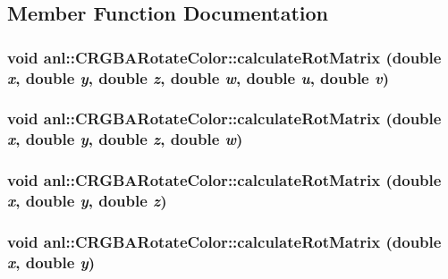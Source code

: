 \subsection{Member Function Documentation}
\hypertarget{classanl_1_1CRGBARotateColor_a828e5dc631081f7f891611b73fafb824}{
\subsubsection[{calculateRotMatrix}]{\setlength{\rightskip}{0pt plus 5cm}void anl::CRGBARotateColor::calculateRotMatrix (double {\em x}, \/  double {\em y}, \/  double {\em z}, \/  double {\em w}, \/  double {\em u}, \/  double {\em v})}}
\label{classanl_1_1CRGBARotateColor_a828e5dc631081f7f891611b73fafb824}
\hypertarget{classanl_1_1CRGBARotateColor_a89534b2e30b2c5951d588d133e8b0909}{
\subsubsection[{calculateRotMatrix}]{\setlength{\rightskip}{0pt plus 5cm}void anl::CRGBARotateColor::calculateRotMatrix (double {\em x}, \/  double {\em y}, \/  double {\em z}, \/  double {\em w})}}
\label{classanl_1_1CRGBARotateColor_a89534b2e30b2c5951d588d133e8b0909}
\hypertarget{classanl_1_1CRGBARotateColor_a8cee6d45519158e48b0f04d05ccf1c16}{
\subsubsection[{calculateRotMatrix}]{\setlength{\rightskip}{0pt plus 5cm}void anl::CRGBARotateColor::calculateRotMatrix (double {\em x}, \/  double {\em y}, \/  double {\em z})}}
\label{classanl_1_1CRGBARotateColor_a8cee6d45519158e48b0f04d05ccf1c16}
\hypertarget{classanl_1_1CRGBARotateColor_a198971009099113094d7da3fa774adf6}{
\subsubsection[{calculateRotMatrix}]{\setlength{\rightskip}{0pt plus 5cm}void anl::CRGBARotateColor::calculateRotMatrix (double {\em x}, \/  double {\em y})}}
